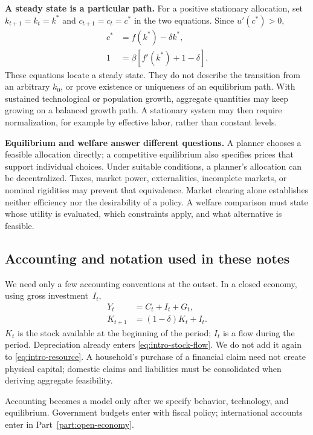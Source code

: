 \textbf{A steady state is a particular path.}
For a positive stationary allocation, set $k_{t+1}=k_t=k^*$ and
$c_{t+1}=c_t=c^*$ in the two equations. Since $u'(c^*)>0$,
\begin{align}
c^*&=f(k^*)-\delta k^*,\\
1&=\beta\left[f'(k^*)+1-\delta\right].
\end{align}
These equations locate a steady state. They do not describe the transition from
an arbitrary $k_0$, or prove existence or uniqueness of an equilibrium path.
With sustained technological or population growth, aggregate quantities may
keep growing on a balanced growth path. A stationary system may then require
normalization, for example by effective labor, rather than constant levels.

\textbf{Equilibrium and welfare answer different questions.}
A planner chooses a feasible allocation directly; a competitive equilibrium
also specifies prices that support individual choices. Under suitable
conditions, a planner's allocation can be decentralized. Taxes, market power,
externalities, incomplete markets, or nominal rigidities may prevent that
equivalence. Market clearing alone establishes neither efficiency nor the
desirability of a policy. A welfare comparison must state whose utility is
evaluated, which constraints apply, and what alternative is feasible.

\subsection{Accounting and notation used in these notes}\label{sec:intro-notation}

We need only a few accounting conventions at the outset. In a closed economy,
using gross investment~$I_t$,
\begin{align}
Y_t&=C_t+I_t+G_t,\label{eq:intro-resource}\\
K_{t+1}&=(1-\delta)K_t+I_t.\label{eq:intro-stock-flow}
\end{align}
$K_t$ is the stock available at the beginning of the period; $I_t$ is a flow
during the period. Depreciation already enters \eqref{eq:intro-stock-flow}.
We do not add it again to \eqref{eq:intro-resource}. A household's purchase of
a financial claim need not create physical capital; domestic claims and
liabilities must be consolidated when deriving aggregate feasibility.

Accounting becomes a model only after we specify behavior, technology, and
equilibrium. Government budgets enter with fiscal policy; international
accounts enter in Part~\ref{part:open-economy}.

